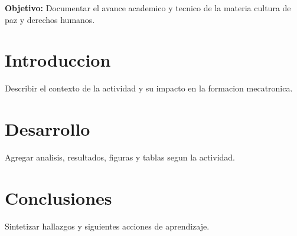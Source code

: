 \documentclass[spanish,letterpaper,oneside]{article}
\begin{document}
\templatePortrait
\templatePagecfg
\onehalfspacing

\begin{abstractd}
\textbf{Objetivo:} Documentar el avance academico y tecnico de la materia cultura de paz y derechos humanos.
\end{abstractd}

\templateIndex
\templateFinalcfg

\section{Introduccion}
Describir el contexto de la actividad y su impacto en la formacion mecatronica.

\section{Desarrollo}
Agregar analisis, resultados, figuras y tablas segun la actividad.

\section{Conclusiones}
Sintetizar hallazgos y siguientes acciones de aprendizaje.



\end{document}
